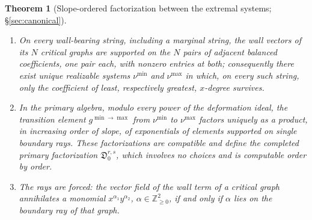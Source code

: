\documentclass[11pt]{amsart}
\newtheorem{theorem}{Theorem}[section]
\theoremstyle{definition}
\theoremstyle{remark}
\newcommand{\ZZ}{\mathbb{Z}}
\newcommand{\Dscr}{\mathfrak{D}}
\begin{document}
\begin{theorem}[Slope-ordered factorization between the extremal systems;
\S\ref{sec:canonical}]
\label{thm:canonical}\mbox{}
\begin{enumerate}
\item[(i)] On every wall-bearing string, including a marginal string, the
wall vectors of its $N$ critical graphs are supported on the $N$
pairs of adjacent balanced coefficients, one pair each, with nonzero entries
at both; consequently there exist unique realizable systems $\nu^{\min}$ and $\nu^{\max}$ in which,
on every such string, only the coefficient of least, respectively greatest,
$x$-degree survives.
\item[(ii)] In the primary algebra, modulo every power of the deformation
ideal, the transition element $g^{\min\to\max}$ from $\nu^{\min}$ to
$\nu^{\max}$ factors uniquely as a product, in increasing order of slope, of
exponentials of elements supported on single boundary rays.  These
factorizations are compatible and define the completed primary factorization
$\Dscr^{r,s}_{0}$, which involves no choices and is computable order by order.
\item[(iii)] The rays are forced: the vector field of the wall term of a
critical graph annihilates a monomial $x^{\alpha_1}y^{\alpha_2}$,
$\alpha\in\ZZ^2_{\ge0}$, if and only if $\alpha$ lies on the boundary ray of
that graph.
\end{enumerate}
\end{theorem}
\end{document}
